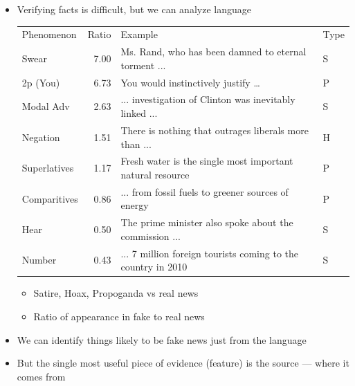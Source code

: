 \documentclass[a4paper,landscape,headrule,footrule,xetex]{foils}
\begin{document}
\begin{itemize}
\item Verifying facts is difficult, but we can analyze language \citep{rashkin-etal-2017-truth}
  \\
  \begin{small}
    \begin{tabular}{lrll}
      Phenomenon & Ratio & Example & Type \\
      Swear& 7.00& Ms. Rand, who has been damned to eternal torment
                  ...& S\\
      2p (You) & 6.73 & You would instinctively justify \ldots & P  \\
      Modal Adv &2.63 &  ... investigation of Clinton  was inevitably
                        linked ... & S \\
      Negation &  1.51 &  There is nothing that outrages liberals more
                         than ...  & H \\
      Superlatives &   1.17 &  Fresh water is the single most
                              important natural resource  &  P \\
      \hline
      Comparitives &   0.86  &  ... from fossil fuels to
                               greener sources of energy  & P  \\
Hear & 0.50 & The prime minister also spoke about the commission ... &
                                                                       S \\
      Number & 0.43 &  ... 7 million foreign tourists coming to the
                      country in 2010 & S \\
    \end{tabular}
  \end{small}
  \begin{itemize}
  \item   Satire, Hoax, Propoganda vs real news
  \item Ratio of appearance in fake to real news
  \end{itemize}
\item We can identify things likely to be fake news just from the
  language
\item But the single most useful piece of evidence (feature) is the
  source --- where it comes from

\end{itemize}
\end{document}
